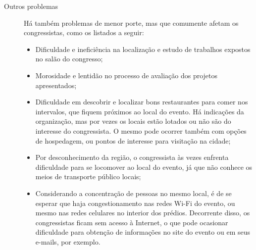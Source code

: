 \documentclass[12pt,a4paper,twoside,hyphens,english,brazil]{abntex2}
\newcommand{\hip}{{\color{BlueViolet}\framebox[1.1\width]{HIP}}}
\begin{document}
\begin{description}
\item[Outros problemas] Há também problemas de menor porte, mas que comumente afetam os congressistas, como os listados a seguir:
	\begin{itemize}[itemsep=-1ex]
		\item \hip{} Dificuldade e ineficiência na localização e estudo de trabalhos expostos no salão do congresso;
		\item \hip{} Morosidade e lentidão no processo de avaliação dos projetos apresentados;
		\item \hip{} Dificuldade em descobrir e localizar bons restaurantes para comer nos intervalos, que fiquem próximos ao local do evento. Há indicações da organização, mas por vezes os locais estão lotados ou não são do interesse do congressista. O mesmo pode ocorrer também com opções de hospedagem, ou pontos de interesse para visitação na cidade;
		\item \hip{} Por desconhecimento da região, o congressista às vezes enfrenta dificuldade para se locomover ao local do evento, já que não conhece os meios de transporte público locais;
		\item \hip{} Considerando a concentração de pessoas no mesmo local, é de se esperar que haja congestionamento nas redes Wi-Fi do evento, ou mesmo nas redes celulares no interior dos prédios. Decorrente disso, os congressistas ficam sem acesso à Internet, o que pode ocasionar dificuldade para obtenção de informações no site do evento ou em seus e-mails, por exemplo.
	\end{itemize}
\end{description}
\end{document}
